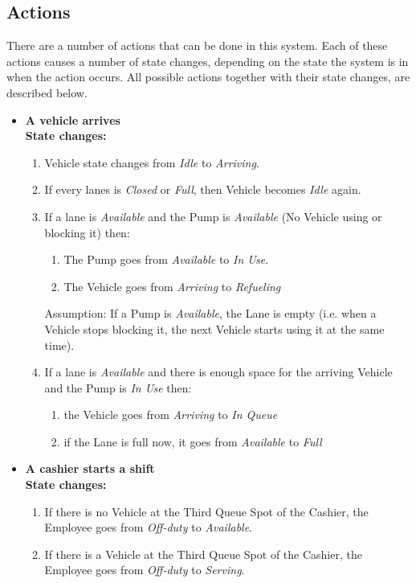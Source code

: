 \subsection{Actions}
There are a number of actions that can be done in this system. Each of these actions causes a number of state changes, depending on the state the system is in when the action occurs. All possible actions together with their state changes, are described below.
\begin{itemize}
\item \textbf{A vehicle arrives}\\
\textbf{State changes:}
\begin{enumerate}
\item Vehicle state changes from \textit{Idle} to \textit{Arriving}.
\item If every lanes is \textit{Closed} or \textit{Full}, then Vehicle becomes \textit{Idle} again.
\item If a lane is \textit{Available} and the Pump is \textit{Available} (No Vehicle using or blocking it) then:
\begin{enumerate}
\item The Pump goes from \textit{Available} to \textit{In Use}.
\item The Vehicle goes from \textit{Arriving} to \textit{Refueling}
\end{enumerate}
Assumption: If a Pump is \textit{Available}, the Lane is empty (i.e. when a Vehicle stops blocking it, the next Vehicle starts using it at the same time).\\
\item If a lane is \textit{Available} and there is enough space for the arriving Vehicle and the Pump is \textit{In Use} then:
\begin{enumerate}
\item the Vehicle goes from \textit{Arriving} to \textit{In Queue}
\item if the Lane is full now, it goes from \textit{Available} to \textit{Full}
\end{enumerate}
\end{enumerate}
\item \textbf{A cashier starts a shift}\\
\textbf{State changes:}
\begin{enumerate}
\item If there is no Vehicle at the Third Queue Spot of the Cashier, the Employee goes from \textit{Off-duty} to \textit{Available}.
\item If there is a Vehicle at the Third Queue Spot of the Cashier, the Employee goes from \textit{Off-duty} to \textit{Serving}.

\end{enumerate}
\end{itemize}
